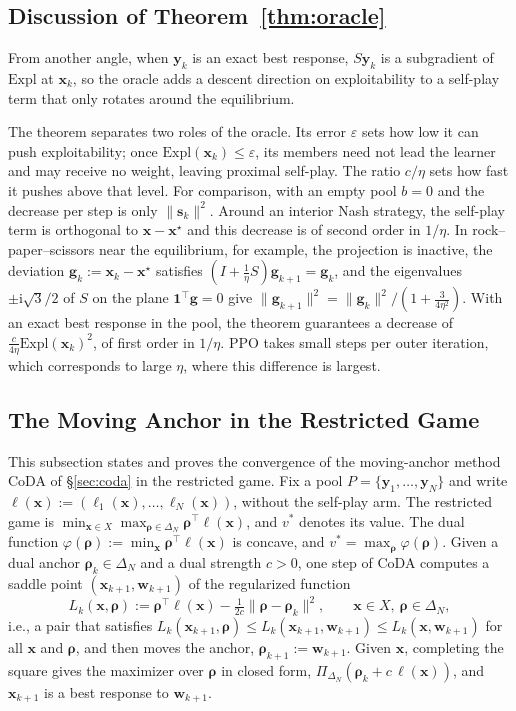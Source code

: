 \documentclass{article} %
\theoremstyle{plain}
\theoremstyle{remark}
\newcommand{\Expl}{\mathrm{Expl}}
\newcommand{\Proj}{\Pi}
\newcommand{\simplex}{\Delta}
\newcommand{\bx}{{\bm{x}}}
\newcommand{\by}{{\bm{y}}}
\newcommand{\bw}{{\bm{w}}}
\newcommand{\bg}{{\bm{g}}}
\newcommand{\brho}{{\bm{\rho}}}
\newcommand{\bell}{{\bm{\ell}}}
\newcommand{\xs}{\bx^{\star}}
\newcommand{\dx}{{\bm{s}}}
\newcommand{\coda}{CoDA}
\begin{document}
\subsection{Discussion of Theorem~\ref{thm:oracle}}
\label{app:oracle-discussion}

From another angle, when $\by_k$ is an exact best response, $S\by_k$ is a subgradient of $\Expl$ at $\bx_k$, so the oracle adds a descent direction on exploitability to a self-play term that only rotates around the equilibrium.

The theorem separates two roles of the oracle. Its error $\varepsilon$ sets how low it can push exploitability; once $\Expl(\bx_k)\le\varepsilon$, its members need not lead the learner and may receive no weight, leaving proximal self-play. The ratio $c/\eta$ sets how fast it pushes above that level. For comparison, with an empty pool $b=0$ and the decrease per step is only $\|\dx_k\|^2$. Around an interior Nash strategy, the self-play term is orthogonal to $\bx-\xs$ and this decrease is of second order in $1/\eta$. In rock--paper--scissors near the equilibrium, for example, the projection is inactive, the deviation $\bg_k:=\bx_k-\xs$ satisfies $(I+\tfrac1\eta S)\bg_{k+1}=\bg_k$, and the eigenvalues $\pm\mathrm i\sqrt3/2$ of $S$ on the plane $\mathbf 1^\top\bg=0$ give $\|\bg_{k+1}\|^2=\|\bg_k\|^2/(1+\tfrac{3}{4\eta^2})$. With an exact best response in the pool, the theorem guarantees a decrease of $\tfrac{c}{4\eta}\Expl(\bx_k)^2$, of first order in $1/\eta$. PPO takes small steps per outer iteration, which corresponds to large $\eta$, where this difference is largest.

\subsection{The Moving Anchor in the Restricted Game}
\label{app:coda}

This subsection states and proves the convergence of the moving-anchor method \coda{} of \S\ref{sec:coda} in the restricted game. Fix a pool $P=\{\by_1,\dots,\by_N\}$ and write $\bell(\bx):=(\ell_1(\bx),\dots,\ell_N(\bx))$, without the self-play arm. The restricted game is $\min_{\bx\in X}\max_{\brho\in\simplex_N}\brho^\top\bell(\bx)$, and $v^*$ denotes its value. The dual function $\varphi(\brho):=\min_\bx\brho^\top\bell(\bx)$ is concave, and $v^*=\max_\brho\varphi(\brho)$. Given a dual anchor $\brho_k\in\simplex_N$ and a dual strength $c>0$, one step of \coda{} computes a saddle point $(\bx_{k+1},\bw_{k+1})$ of the regularized function
\begin{equation}
L_k(\bx,\brho):=\brho^\top\bell(\bx)-\tfrac1{2c}\|\brho-\brho_k\|^2 ,\qquad \bx\in X,\ \brho\in\simplex_N,
\label{eq:coda}
\end{equation}
i.e., a pair that satisfies $L_k(\bx_{k+1},\brho)\le L_k(\bx_{k+1},\bw_{k+1})\le L_k(\bx,\bw_{k+1})$ for all $\bx$ and $\brho$, and then moves the anchor, $\brho_{k+1}:=\bw_{k+1}$. Given $\bx$, completing the square gives the maximizer over $\brho$ in closed form, $\Proj_{\simplex_N}(\brho_k+c\,\bell(\bx))$, and $\bx_{k+1}$ is a best response to $\bw_{k+1}$.
\end{document}
